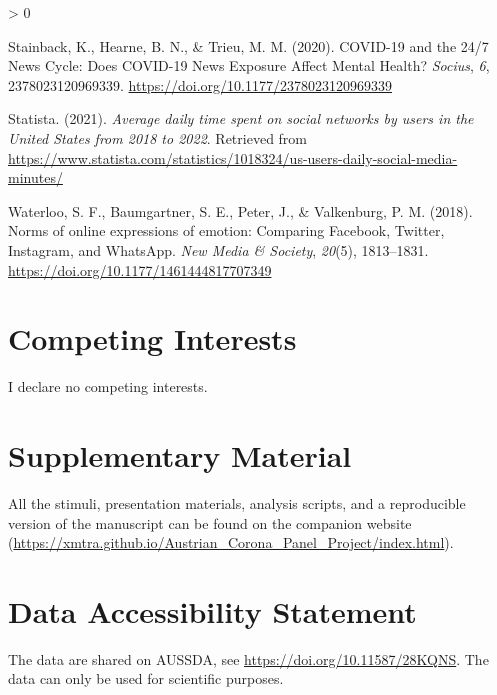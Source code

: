 \documentclass[
  english,
  man,mask,floatsintext]{apa6}
\newlength{\cslhangindent}
\newenvironment{CSLReferences}[2] %
 {%
  \setlength{\parindent}{0pt}
  \ifodd #1 \everypar{\setlength{\hangindent}{\cslhangindent}}\ignorespaces\fi
  \ifnum #2 > 0
  \setlength{\parskip}{#2\baselineskip}
  \fi
 }%
 {}
\begin{document}
\begin{CSLReferences}{1}{0}
\leavevmode\hypertarget{ref-stainbackCOVID1924News2020}{}%
Stainback, K., Hearne, B. N., \& Trieu, M. M. (2020). {COVID}-19 and the 24/7 {News} {Cycle}: {Does} {COVID}-19 {News} {Exposure} {Affect} {Mental} {Health}? \emph{Socius}, \emph{6}, 2378023120969339. \url{https://doi.org/10.1177/2378023120969339}

\leavevmode\hypertarget{ref-statistaAverageDailyTime2021}{}%
Statista. (2021). \emph{Average daily time spent on social networks by users in the {United} {States} from 2018 to 2022}. Retrieved from \url{https://www.statista.com/statistics/1018324/us-users-daily-social-media-minutes/}

\leavevmode\hypertarget{ref-waterlooNormsOnlineExpressions2018}{}%
Waterloo, S. F., Baumgartner, S. E., Peter, J., \& Valkenburg, P. M. (2018). Norms of online expressions of emotion: {Comparing} {Facebook}, {Twitter}, {Instagram}, and {WhatsApp}. \emph{New Media \& Society}, \emph{20}(5), 1813--1831. \url{https://doi.org/10.1177/1461444817707349}

\end{CSLReferences}

\newpage

\hypertarget{competing-interests}{%
\section{Competing Interests}\label{competing-interests}}

I declare no competing interests.

\hypertarget{supplementary-material}{%
\section{Supplementary Material}\label{supplementary-material}}

All the stimuli, presentation materials, analysis scripts, and a reproducible version of the manuscript can be found on the companion website (\url{https://xmtra.github.io/Austrian_Corona_Panel_Project/index.html}).

\hypertarget{data-accessibility-statement}{%
\section{Data Accessibility Statement}\label{data-accessibility-statement}}

The data are shared on AUSSDA, see \url{https://doi.org/10.11587/28KQNS}.
The data can only be used for scientific purposes.
\end{document}
